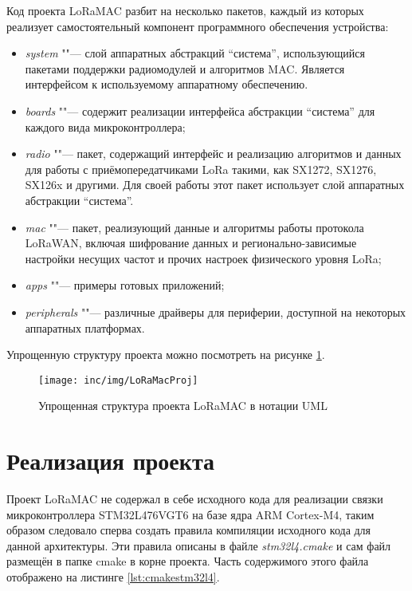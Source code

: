 Код проекта LoRaMAC разбит на несколько пакетов, каждый из которых реализует 
самостоятельный компонент программного обеспечения устройства:
\begin{itemize}
 \item \textit{system} ""--- слой аппаратных абстракций ``система'', 
использующийся пакетами поддержки радиомодулей и алгоритмов MAC. Является 
интерфейсом к используемому аппаратному обеспечению.
 \item \textit{boards} ""--- содержит реализации интерфейса абстракции 
``система'' для каждого вида микроконтроллера;
 \item \textit{radio} ""--- пакет, содержащий интерфейс и реализацию алгоритмов 
и данных для работы с приёмопередатчиками LoRa такими, как SX1272, SX1276, 
SX126x и другими. Для своей работы этот пакет использует слой аппаратных 
абстракции ``система''. 
 \item \textit{mac} ""--- пакет, реализующий данные и алгоритмы работы 
протокола LoRaWAN, включая шифрование данных и регионально-зависимые настройки 
несущих частот и прочих настроек физического уровня LoRa;
 \item \textit{apps} ""--- примеры готовых приложений;
 \item \textit{peripherals} ""--- различные драйверы для периферии, доступной 
на некоторых аппаратных платформах.
\end{itemize}

Упрощенную структуру проекта можно посмотреть на рисунке 
\ref{fig:loramacstructure}.

\begin{figure}[!h]
  \centering
  \texttt{[image: inc/img/LoRaMacProj]}
  \caption{Упрощенная структура проекта LoRaMAC в нотации UML}
  \label{fig:loramacstructure}
\end{figure}

\section{Реализация проекта}

Проект LoRaMAC не содержал в себе исходного кода для реализации связки 
микроконтроллера STM32L476VGT6 на базе ядра ARM Cortex-M4, таким образом 
следовало сперва создать правила компиляции исходного кода для данной 
архитектуры. Эти правила описаны в файле \textit{stm32l4.cmake} и сам файл 
размещён в папке cmake в корне проекта. Часть содержимого этого файла 
отображено на листинге \ref{lst:cmakestm32l4}.

